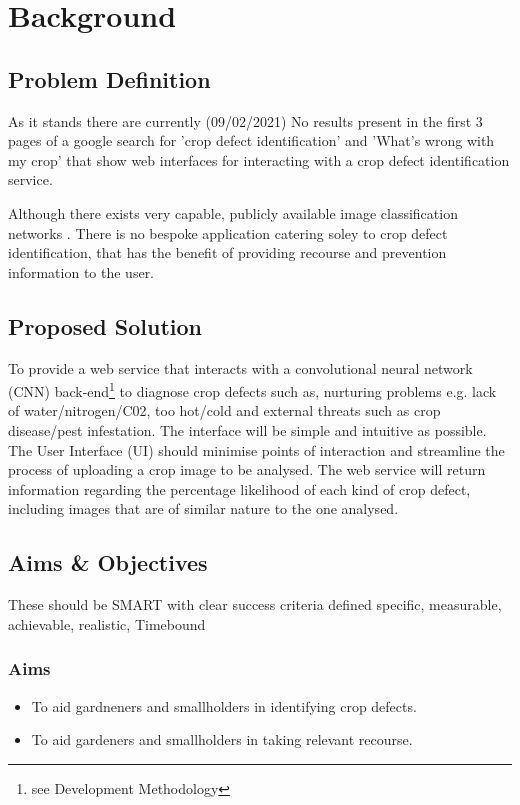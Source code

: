 \chapter{Background}
\section{Problem Definition}
  As it stands there are currently (09/02/2021) No results present in the first 3 pages of a google search for 'crop defect identification' and 'What's wrong with my crop' that show web interfaces for interacting with a crop defect identification service.
  \par
  Although there exists very capable, publicly available image classification networks \citep{Yandex}. There is no bespoke application catering soley to crop defect identification, that has the benefit of providing recourse and prevention information to the user.

\section{Proposed Solution}
  To provide a web service that interacts with a convolutional neural network (CNN) back-end\footnote{see Development Methodology} to diagnose crop defects such as, nurturing problems e.g. lack of water/nitrogen/C02, too hot/cold and external threats such as crop disease/pest infestation. The interface will be simple and intuitive as possible. The User Interface (UI) should minimise points of interaction and streamline the process of uploading a crop image to be analysed.
	The web service will return information regarding the percentage likelihood of each kind of crop defect, including images that are of similar nature to the one analysed.

\section{Aims \& Objectives}
  These should be SMART with clear success criteria defined
  specific, measurable, achievable, realistic, Timebound
  \subsection{Aims}
    \begin{itemize}
      \item To aid gardneners and smallholders in identifying crop defects.
      \item To aid gardeners and smallholders in taking relevant recourse.
    \end{itemize}
